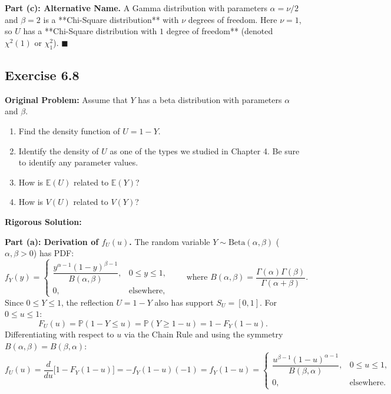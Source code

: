 \documentclass[11pt, letterpaper]{article}
\theoremstyle{definition}
\theoremstyle{remark}
\newcommand{\E}{\mathbb{E}}
\newcommand{\Prob}{\mathbb{P}}
\begin{document}
\textbf{Part (c): Alternative Name.}
A Gamma distribution with parameters $\alpha = \nu/2$ and $\beta = 2$ is a **Chi-Square distribution** with $\nu$ degrees of freedom. Here $\nu = 1$, so $U$ has a **Chi-Square distribution with $1$ degree of freedom** (denoted $\chi^2(1)$ or $\chi^2_1$). \hfill $\blacksquare$

\subsection{Exercise 6.8}

\textbf{Original Problem:}
Assume that $Y$ has a beta distribution with parameters $\alpha$ and $\beta$.
\begin{enumerate}[label=\textbf{\alph*}]
    \item Find the density function of $U = 1 - Y$.
    \item Identify the density of $U$ as one of the types we studied in Chapter 4. Be sure to identify any parameter values.
    \item How is $\E(U)$ related to $\E(Y)$?
    \item How is $V(U)$ related to $V(Y)$?
\end{enumerate}

\hrulefill

\textbf{Rigorous Solution:}

\textbf{Part (a): Derivation of $f_U(u)$.}
The random variable $Y \sim \text{Beta}(\alpha, \beta)$ ($\alpha, \beta > 0$) has PDF:
\[
    f_Y(y) = \begin{cases} \dfrac{y^{\alpha - 1}(1 - y)^{\beta - 1}}{B(\alpha, \beta)}, & 0 \le y \le 1, \\[6pt] 0, & \text{elsewhere,} \end{cases} \qquad \text{where } B(\alpha, \beta) = \frac{\Gamma(\alpha)\Gamma(\beta)}{\Gamma(\alpha + \beta)}.
\]
Since $0 \le Y \le 1$, the reflection $U = 1 - Y$ also has support $S_U = [0, 1]$. For $0 \le u \le 1$:
\[
    F_U(u) = \Prob(1 - Y \le u) = \Prob(Y \ge 1 - u) = 1 - F_Y(1 - u).
\]
Differentiating with respect to $u$ via the Chain Rule and using the symmetry $B(\alpha, \beta) = B(\beta, \alpha)$:
\[
    f_U(u) = \frac{d}{du}\big[1 - F_Y(1 - u)\big] = -f_Y(1 - u)(-1) = f_Y(1 - u) = \begin{cases} \dfrac{u^{\beta - 1}(1 - u)^{\alpha - 1}}{B(\beta, \alpha)}, & 0 \le u \le 1, \\[6pt] 0, & \text{elsewhere.} \end{cases}
\]
\end{document}
